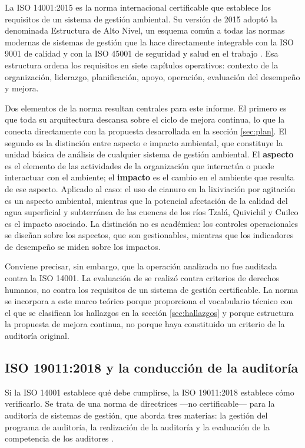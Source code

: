 La ISO 14001:2015 es la norma internacional certificable que establece los
requisitos de un sistema de gestión ambiental. Su versión de 2015 adoptó la
denominada Estructura de Alto Nivel, un esquema común a todas las normas
modernas de sistemas de gestión que la hace directamente integrable con la
ISO 9001 de calidad y con la ISO 45001 de seguridad y salud en el trabajo
\parencite{iso2015iso14001}. Esa estructura ordena los requisitos en siete
capítulos operativos: contexto de la organización, liderazgo, planificación,
apoyo, operación, evaluación del desempeño y mejora.

Dos elementos de la norma resultan centrales para este informe. El primero es que
toda su arquitectura descansa sobre el ciclo de mejora continua, lo que la conecta
directamente con la propuesta desarrollada en la sección \ref{sec:plan}. El
segundo es la distinción entre aspecto e impacto ambiental, que constituye la
unidad básica de análisis de cualquier sistema de gestión ambiental. El
\textbf{aspecto} es el elemento de las actividades de la organización que
interactúa o puede interactuar con el ambiente; el \textbf{impacto} es el cambio
en el ambiente que resulta de ese aspecto. Aplicado al caso: el uso de cianuro en
la lixiviación por agitación es un aspecto ambiental, mientras que la potencial
afectación de la calidad del agua superficial y subterránea de las cuencas de los
ríos Tzalá, Quivichil y Cuilco es el impacto asociado. La distinción no es
académica: los controles operacionales se diseñan sobre los aspectos, que son
gestionables, mientras que los indicadores de desempeño se miden sobre los
impactos.

Conviene precisar, sin embargo, que la operación analizada no fue auditada contra
la ISO 14001. La evaluación de \textcite{oncommonground2010hria} se realizó contra
criterios de derechos humanos, no contra los requisitos de un sistema de gestión
certificable. La norma se incorpora a este marco teórico porque proporciona el
vocabulario técnico con el que se clasifican los hallazgos en la sección
\ref{sec:hallazgos} y porque estructura la propuesta de mejora continua, no
porque haya constituido un criterio de la auditoría original.

\subsection{ISO 19011:2018 y la conducción de la auditoría}

Si la ISO 14001 establece qué debe cumplirse, la ISO 19011:2018 establece cómo
verificarlo. Se trata de una norma de directrices —no certificable— para la
auditoría de sistemas de gestión, que aborda tres materias: la gestión del
programa de auditoría, la realización de la auditoría y la evaluación de la
competencia de los auditores \parencite{iso2018iso19011}.

